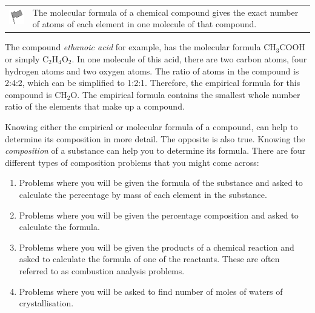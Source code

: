\label{m38712*fhsst!!!underscore!!!id888}\begin{definition}
	  \begin{tabular*}{15 cm}{m{15 mm}m{}}
	\hspace*{-50pt}  \includegraphics[width=0.5in]{col11305.imgs/psflag2.png}   & \Definition{   \label{id2501878}\textbf{ Molecular formula }} { \label{m38712*meaningfhsst!!!underscore!!!id888}
      \label{m38712*id280360}The molecular formula of a chemical compound gives the exact number of atoms of each element in one molecule of that compound. \par 
       } 
      \end{tabular*}
      \end{definition}

      \label{m38712*id280372}The compound \textsl{ethanoic acid} for example, has the molecular formula \begin{math}\mathrm{CH}{}_{3}\mathrm{COOH}\end{math} or simply \begin{math}\mathrm{C}{}_{2}\mathrm{H}{}_{4}\mathrm{O}{}_{2}\end{math}. In one molecule of this acid, there are two carbon atoms, four hydrogen atoms and two oxygen atoms. The ratio of atoms in the compound is 2:4:2, which can be simplified to 1:2:1. Therefore, the empirical formula for this compound is \begin{math}\mathrm{CH}{}_{2}\mathrm{O}\end{math}. The empirical formula contains the smallest whole number ratio of the elements that make up a compound.\par 
      \label{m38712*id280450}Knowing either the empirical or molecular formula of a compound, can help to determine its composition in more detail. The opposite is also true. Knowing the \textsl{composition} of a substance can help you to determine its formula. There are four different types of composition problems that you might come across:\par 
      \label{m38712*id280463}\begin{enumerate}[noitemsep, label=\textbf{\arabic*}. ] 
            \label{m38712*uid68}\item Problems where you will be given the formula of the substance and asked to calculate the percentage by mass of each element in the substance.
\label{m38712*uid69}\item Problems where you will be given the percentage composition and asked to calculate the formula.
\label{m38712*uid70}\item Problems where you will be given the products of a chemical reaction and asked to calculate the formula of one of the reactants. These are often referred to as combustion analysis problems.
\label{m38712*uid7021}\item Problems where you will be asked to find number of moles of waters of crystallisation.
\end{enumerate}
        

